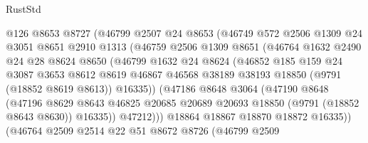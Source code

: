 \begin{lexlean}{RustStd}
\begin{coremodule}
                    @126
                    @8653
                    @8727
                    (@46799
                      @2507
                      @24
                      @8653
                      (@46749
                        @572
                        @2506
                        @1309
                        @24
                        @3051
                        @8651
                        @2910
                        @1313
                        (@46759
                          @2506
                          @1309
                          @8651
                          (@46764
                            @1632
                            @2490
                            @24
                            @28
                            @8624
                            @8650
                            (@46799
                              @1632
                              @24
                              @8624
                              (@46852
                                @185
                                @159
                                @24
                                @3087
                                @3653
                                @8612
                                @8619
                                @46867
                                @46568
                                @38189
                                @38193
                                @18850
                                (@9791 (@18852 @8619 @8613))
                                @16335))
                            (@47186
                              @8648
                              @3064
                              (@47190
                                @8648
                                (@47196
                                  @8629
                                  @8643
                                  @46825
                                  @20685
                                  @20689
                                  @20693
                                  @18850
                                  (@9791 (@18852 @8643 @8630))
                                  @16335))
                              @47212)))
                        @18864
                        @18867
                        @18870
                        @18872
                        @16335))
                    (@46764
                      @2509
                      @2514
                      @22
                      @51
                      @8672
                      @8726
                      (@46799
                        @2509

\end{coremodule}
\end{lexlean}
